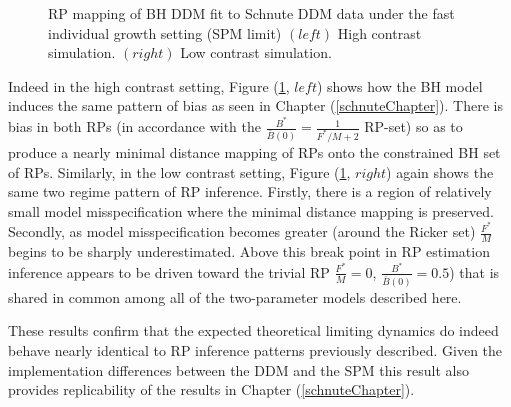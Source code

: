 \begin{figure}[h!]
\begin{minipage}[h!]{0.09\textwidth}
\end{minipage}
\caption{
RP mapping of BH DDM fit to Schnute DDM data under the fast individual growth setting (SPM limit)
$(left)$ High contrast simulation.
$(right)$ Low contrast simulation.
}\label{prodLimit}
\end{figure}


Indeed in the high contrast setting, Figure (\ref{prodLimit}, $left$) shows
how the BH model induces the same pattern of bias as seen in Chapter
(\ref{schnuteChapter}). There is bias in both RPs (in accordance with the
$\frac{B^*}{\bar B(0)}=\frac{1}{F^*/M+2}$ RP-set) so as to produce a nearly
minimal distance mapping of RPs onto the constrained BH set of RPs.
Similarly, in the low contrast setting, Figure (\ref{prodLimit}, $right$) again
shows the same two regime pattern of RP inference. Firstly, there is a region of
relatively small model misspecification where the minimal distance mapping
is preserved. Secondly, as model misspecification becomes greater (around the
Ricker set) $\frac{F^*}{M}$ begins to be sharply underestimated. Above this
break point in RP estimation inference appears to be driven toward the trivial RP
$\frac{F^*}{M}=0$, $\frac{B^*}{\bar B(0)}=0.5$) that is shared in common
among all of the two-parameter models described here.

%
These results confirm that the expected theoretical limiting dynamics do indeed behave 
nearly identical to RP inference patterns previously described. Given the implementation 
differences between the DDM and the SPM this result also provides replicability %
of the results in Chapter (\ref{schnuteChapter}). 

